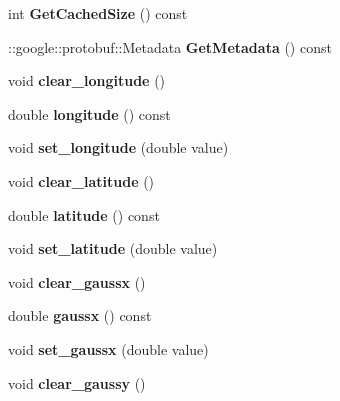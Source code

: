 \begin{DoxyCompactItemize}
int {\bfseries Get\+Cached\+Size} () const
\item 
\mbox{\label{class_i_m_u_1_1_imu_ac58a9208d57f86e50eee1a9c922de5d5}} 
\+::google\+::protobuf\+::\+Metadata {\bfseries Get\+Metadata} () const
\item 
\mbox{\label{class_i_m_u_1_1_imu_a79cce50e11082ead954418294e64b826}} 
void {\bfseries clear\+\_\+longitude} ()
\item 
\mbox{\label{class_i_m_u_1_1_imu_ab1235a733f31221c5634f14e46db1b4b}} 
double {\bfseries longitude} () const
\item 
\mbox{\label{class_i_m_u_1_1_imu_a634aefa7db2594bd00fc0e59f60a07f0}} 
void {\bfseries set\+\_\+longitude} (double value)
\item 
\mbox{\label{class_i_m_u_1_1_imu_ac00c20d62efa57e7d45acba28594d18c}} 
void {\bfseries clear\+\_\+latitude} ()
\item 
\mbox{\label{class_i_m_u_1_1_imu_a06731619e160c5f0186f1ff7029f2a3a}} 
double {\bfseries latitude} () const
\item 
\mbox{\label{class_i_m_u_1_1_imu_a97d5532a175c2553c980d0164bd862a2}} 
void {\bfseries set\+\_\+latitude} (double value)
\item 
\mbox{\label{class_i_m_u_1_1_imu_ac57f5707c567930a12052b276bae4edd}} 
void {\bfseries clear\+\_\+gaussx} ()
\item 
\mbox{\label{class_i_m_u_1_1_imu_a01fe2aa48cad4cd6aa40f0cdc1fd5e10}} 
double {\bfseries gaussx} () const
\item 
\mbox{\label{class_i_m_u_1_1_imu_a668f2e300c69242dbce4db0bc2b22282}} 
void {\bfseries set\+\_\+gaussx} (double value)
\item 
\mbox{\label{class_i_m_u_1_1_imu_ad262c5381c4db4cbc06b5fa086d30c1a}} 
void {\bfseries clear\+\_\+gaussy} ()
\item 

\end{DoxyCompactItemize}
